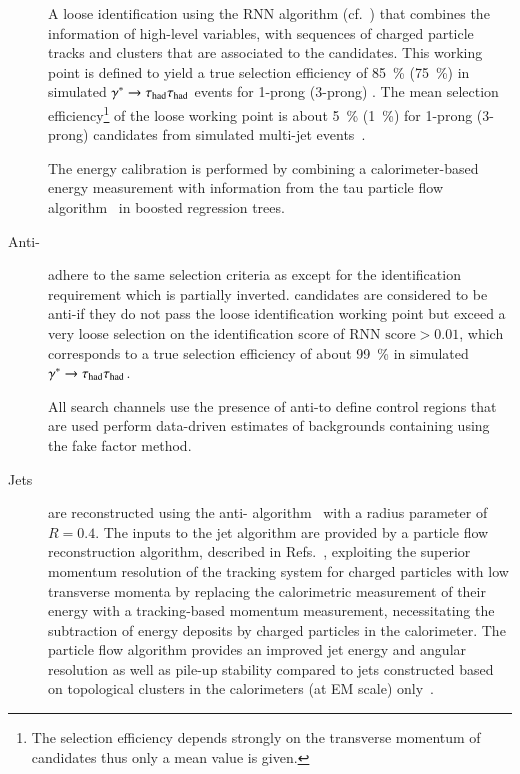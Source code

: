 \begin{description}
  A loose \tauhadvis identification using the RNN algorithm
  (cf.~) that combines the information of high-level
  variables, with sequences of charged particle tracks and clusters
  that are associated to the \tauhadvis candidates. This working point
  is defined to yield a true \tauhadvis selection efficiency of
  \SI{85}{\percent} (\SI{75}{\percent}) in simulated
  $\gamma^* \to \tau_{\text{had}}\tau_{\text{had}}$ events for 1-prong (3-prong)
  \tauhadvis. The mean \faketauhadvis selection
  efficiency\footnote{The \faketauhadvis selection efficiency depends
    strongly on the transverse momentum of \tauhadvis candidates thus
    only a mean value is given.} of the loose working point is about
  \SI{5}{\percent} (\SI{1}{\percent}) for 1-prong (3-prong) \tauhadvis
  candidates from simulated multi-jet
  events~\cite{ATL-PHYS-PUB-2019-033}.

  The \tauhadvis energy calibration is performed by combining a
  calorimeter-based energy measurement with information from the tau
  particle flow algorithm~\cite{PERF-2014-06} in boosted regression
  trees.



\item[Anti-\tauhadvis] adhere to the same selection criteria as
  \tauhadvis except for the \tauhadvis identification requirement
  which is partially inverted. \tauhadvis candidates are considered to
  be anti-\tauhadvis if they do not pass the loose \tauhadvis
  identification working point but exceed a very loose selection on
  the \tauhadvis identification score of $\text{RNN score} > 0.01$,
  which corresponds to a true \tauhadvis selection efficiency of about
  \SI{99}{\percent} in simulated $\gamma^* \to \tau_{\text{had}}\tau_{\text{had}}$.

  All search channels use the presence of anti-\tauhadvis to define
  control regions that are used perform data-driven estimates of
  backgrounds containing \faketauhadvis using the fake factor method.


\item[Jets] are reconstructed using the anti-\kt
  algorithm~\cite{Cacciari:2008gp} with a radius parameter
  of~$R = 0.4$. The inputs to the jet algorithm are provided by a
  particle flow reconstruction algorithm, described in
  Refs.~\cite{PERF-2015-09,JETM-2018-05}, exploiting the superior
  momentum resolution of the tracking system for charged particles
  with low transverse momenta by replacing the calorimetric
  measurement of their energy with a tracking-based momentum
  measurement, necessitating the subtraction of energy deposits by
  charged particles in the calorimeter. The particle flow algorithm
  provides an improved jet energy and angular resolution as well as
  pile-up stability compared to jets constructed based on topological
  clusters in the calorimeters (at EM scale)
  only~\cite{PERF-2015-09,JETM-2018-05}.


\end{description}
